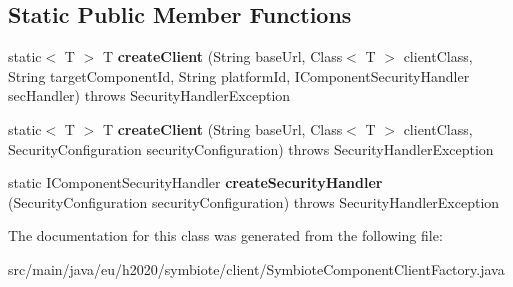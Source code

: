 \subsection*{Static Public Member Functions}
\begin{DoxyCompactItemize}
\item 
\mbox{\label{classeu_1_1h2020_1_1symbiote_1_1client_1_1SymbioteComponentClientFactory_aa8d04d25ece0f9b5f1746bd8febdd4f8}} 
static$<$ T $>$ T {\bfseries create\+Client} (String base\+Url, Class$<$ T $>$ client\+Class, String target\+Component\+Id, String platform\+Id, I\+Component\+Security\+Handler sec\+Handler)  throws Security\+Handler\+Exception 
\item 
\mbox{\label{classeu_1_1h2020_1_1symbiote_1_1client_1_1SymbioteComponentClientFactory_a3baff06dc7982eb1b49ef4e587b5fb20}} 
static$<$ T $>$ T {\bfseries create\+Client} (String base\+Url, Class$<$ T $>$ client\+Class, Security\+Configuration security\+Configuration)  throws Security\+Handler\+Exception 
\item 
\mbox{\label{classeu_1_1h2020_1_1symbiote_1_1client_1_1SymbioteComponentClientFactory_a8fb5920d9e4093ec020240872d3e1719}} 
static I\+Component\+Security\+Handler {\bfseries create\+Security\+Handler} (Security\+Configuration security\+Configuration)  throws Security\+Handler\+Exception 
\end{DoxyCompactItemize}


The documentation for this class was generated from the following file\+:\begin{DoxyCompactItemize}
\item 
src/main/java/eu/h2020/symbiote/client/Symbiote\+Component\+Client\+Factory.\+java\end{DoxyCompactItemize}
